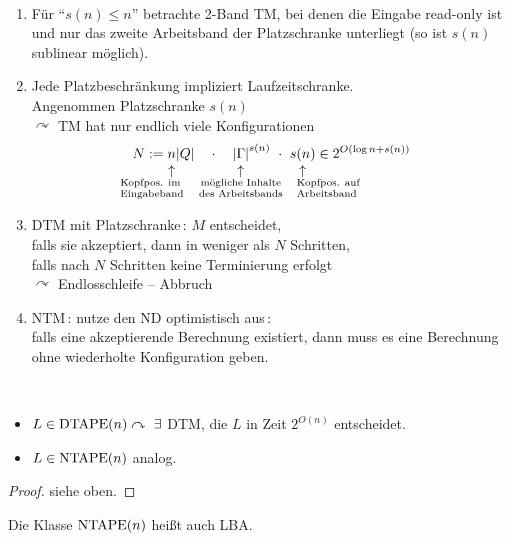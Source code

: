 \begin{Bemerkung}\
	\newcommand{\underarrowset}[2]{%
		\underset{%
			\mathclap{%
				\overset{\displaystyle\uparrow}{\mathclap{#1}}%
			}%
		}{#2}%
	}
	\begin{enumerate}
	\item Für "`$s(n)\leq n$"' betrachte 2-Band \ac{TM}, bei denen die Eingabe read-only ist und nur das zweite Arbeitsband der Platzschranke unterliegt (so ist $s(n)$ sublinear möglich).
	\item Jede Platzbeschränkung impliziert Laufzeitschranke.\\
	Angenommen Platzschranke $s(n)$\\
	$\curvearrowright$ \ac{TM} hat nur endlich viele Konfigurationen
	\[ N := \underarrowset{%
			\parbox{\widthof{\scriptsize Eingabeband}}{\raggedright\scriptsize Kopfpos. im Eingabeband}\hspace{1cm}
		}{n\vphantom{|}}
		|Q| \quad\cdot\quad
		\underarrowset{\parbox{2.2cm}{\scriptsize\centering mögliche Inhalte des Arbeitsbands}}{|\Gamma|}^{s(n)}
		\ \cdot\
		\underarrowset{\hspace{1.7cm}\parbox{2cm}{\scriptsize Kopfpos. auf\\ Arbeitsband}}{s(n)}
		\in 2^{O(\log n + s(n))}
	\]
	\item \ac{DTM} mit Platzschranke\,: $M$ entscheidet,\\
	falls sie akzeptiert, dann in weniger als $N$ Schritten,\\
	falls nach $N$ Schritten keine Terminierung erfolgt\\
	\quad$\curvearrowright$ Endlosschleife -- Abbruch
	\item \ac{NTM}\,: nutze den \ac{ND} optimistisch aus\,:\\
	falls eine akzeptierende Berechnung existiert, dann muss es eine Berechnung ohne wiederholte Konfiguration geben.
	\end{enumerate}
\end{Bemerkung}
\begin{Satz}[name={[$L\in\DTAPE(n),\ L\in\NTAPE(n)$]}]\label{satz:6.2}\
	\begin{itemize}
	\item $L\in\operatorname{DTAPE}(n) \curvearrowright\ \exists$ \ac{DTM}, die $L$ in Zeit $2^{O(n)}$ entscheidet.
	\item $L\in\operatorname{NTAPE}(n)$ analog.
	\end{itemize}
\end{Satz}\vspace{-2em}
\begin{proof}
	siehe oben.
\end{proof}
\begin{Bemerkung}
	Die Klasse $\operatorname{NTAPE} (n)$ heißt auch \ac{LBA}.
\end{Bemerkung}
%


